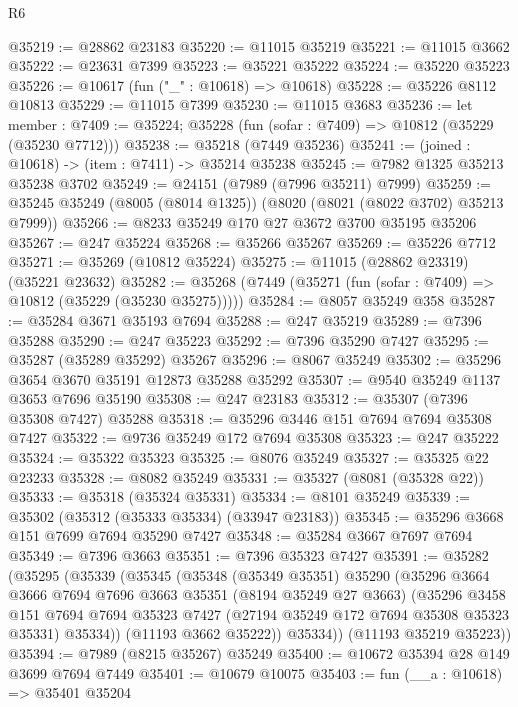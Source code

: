 \begin{lexlean}{R6}
\begin{coremodule}
@35219 := @28862 @23183
@35220 := @11015 @35219
@35221 := @11015 @3662
@35222 := @23631 @7399
@35223 := @35221 @35222
@35224 := @35220 @35223
@35226 := @10617 (fun ("_" : @10618) => @10618)
@35228 := @35226 @8112 @10813
@35229 := @11015 @7399
@35230 := @11015 @3683
@35236 := let member : @7409 := @35224;
  @35228 (fun (sofar : @7409) => @10812 (@35229 (@35230 @7712)))
@35238 := @35218 (@7449 @35236)
@35241 := (joined : @10618) -> (item : @7411) -> @35214 @35238
@35245 := @7982 @1325 @35213 @35238 @3702
@35249 := @24151 (@7989 (@7996 @35211) @7999)
@35259 := @35245 @35249 (@8005 (@8014 @1325)) (@8020 (@8021 (@8022 @3702) @35213 @7999))
@35266 := @8233 @35249 @170 @27 @3672 @3700 @35195 @35206
@35267 := @247 @35224
@35268 := @35266 @35267
@35269 := @35226 @7712
@35271 := @35269 (@10812 @35224)
@35275 := @11015 (@28862 @23319) (@35221 @23632)
@35282 := @35268 (@7449 (@35271 (fun (sofar : @7409) => @10812 (@35229 (@35230 @35275)))))
@35284 := @8057 @35249 @358
@35287 := @35284 @3671 @35193 @7694
@35288 := @247 @35219
@35289 := @7396 @35288
@35290 := @247 @35223
@35292 := @7396 @35290 @7427
@35295 := @35287 (@35289 @35292) @35267
@35296 := @8067 @35249
@35302 := @35296 @3654 @3670 @35191 @12873 @35288 @35292
@35307 := @9540 @35249 @1137 @3653 @7696 @35190
@35308 := @247 @23183
@35312 := @35307 (@7396 @35308 @7427) @35288
@35318 := @35296 @3446 @151 @7694 @7694 @35308 @7427
@35322 := @9736 @35249 @172 @7694 @35308
@35323 := @247 @35222
@35324 := @35322 @35323
@35325 := @8076 @35249
@35327 := @35325 @22 @23233
@35328 := @8082 @35249
@35331 := @35327 (@8081 (@35328 @22))
@35333 := @35318 (@35324 @35331)
@35334 := @8101 @35249
@35339 := @35302 (@35312 (@35333 @35334) (@33947 @23183))
@35345 := @35296 @3668 @151 @7699 @7694 @35290 @7427
@35348 := @35284 @3667 @7697 @7694
@35349 := @7396 @3663
@35351 := @7396 @35323 @7427
@35391 := @35282
    (@35295
      (@35339
        (@35345
          (@35348
            (@35349 @35351)
            @35290
            (@35296
              @3664
              @3666
              @7694
              @7696
              @3663
              @35351
              (@8194 @35249 @27 @3663)
              (@35296
                @3458
                @151
                @7694
                @7694
                @35323
                @7427
                (@27194 @35249 @172 @7694 @35308 @35323 @35331)
                @35334))
            (@11193 @3662 @35222))
          @35334))
      (@11193 @35219 @35223))
@35394 := @7989 (@8215 @35267) @35249
@35400 := @10672 @35394 @28 @149 @3699 @7694 @7449
@35401 := @10679 @10075
@35403 := fun (__a : @10618) => @35401 @35204

\end{coremodule}
\end{lexlean}
